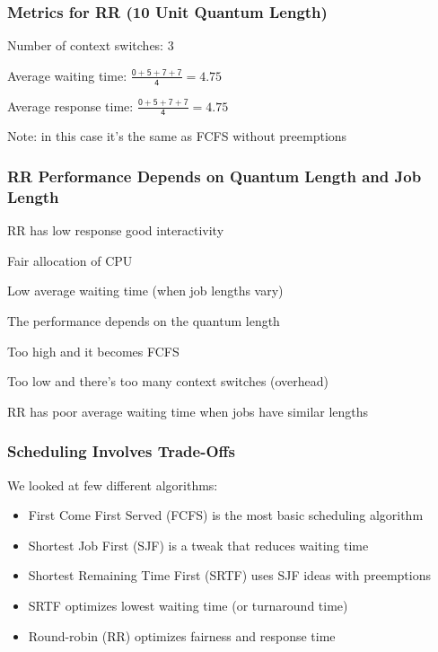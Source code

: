   \begin{frame}
    \frametitle{Metrics for RR (10 Unit Quantum Length)}

    Number of context switches: 3

    \vspace{2em}

    Average waiting time: $\mathsf{\frac{0 + 5 + 7 + 7}{4} = 4.75}$

    \vspace{2em}

    Average response time: $\mathsf{\frac{0 + 5 + 7 + 7}{4} = 4.75}$

    \vspace{4em}

    Note: in this case it's the same as FCFS without preemptions
  \end{frame}

  \begin{frame}
    \frametitle{RR Performance Depends on Quantum Length and Job Length}

    RR has low response good interactivity

    \hspace{2em} Fair allocation of CPU

    \hspace{2em} Low average waiting time (when job lengths vary)

    \vspace{4em}

    The performance depends on the quantum length

    \hspace{2em} Too high and it becomes FCFS

    \hspace{2em} Too low and there's too many context switches (overhead)

    \vspace{2em}

    RR has poor average waiting time when jobs have similar lengths
  \end{frame}

  \begin{frame}
    \frametitle{Scheduling Involves Trade-Offs}

    We looked at few different algorithms:
    \begin{itemize}
      \item First Come First Served (FCFS) is the most basic scheduling algorithm
      \item Shortest Job First (SJF) is a tweak that reduces waiting time
      \item Shortest Remaining Time First (SRTF) uses SJF ideas with preemptions
      \item SRTF optimizes lowest waiting time (or turnaround time)
      \item Round-robin (RR) optimizes fairness and response time
    \end{itemize}
  \end{frame}

